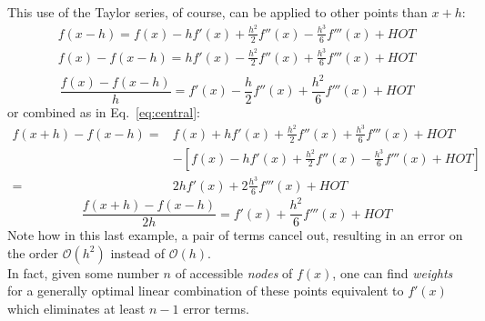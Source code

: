 \documentclass[12pt]{article}
\newcommand{\bigO}{\mathcal{O}}
\begin{document}
This use of the Taylor series, of course, can be applied to other points than $x+h$:
\begin{gather*}
    f(x-h)=f(x)-hf'(x)+\frac{h^2}{2}f''(x)-\frac{h^3}{6}f'''(x)+HOT \\
    f(x)-f(x-h)=hf'(x)-\frac{h^2}{2}f''(x)+\frac{h^3}{6}f'''(x)+HOT \\
\end{gather*}
\begin{equation}
    \frac{f(x)-f(x-h)}{h}=f'(x)-\frac{h}{2}f''(x)+\frac{h^2}{6}f'''(x)+HOT
\end{equation}
or combined as in Eq.~\ref{eq:central}:
\begin{align*}
    f(x+h)-f(x-h)=&f(x)+hf'(x)+\frac{h^2}{2}f''(x)+\frac{h^3}{6}f'''(x)+HOT\\
    &-\left[f(x)-hf'(x)+\frac{h^2}{2}f''(x)-\frac{h^3}{6}f'''(x)+HOT\right]\\
    =&2hf'(x)+2\frac{h^3}{6}f'''(x)+HOT
\end{align*}
\begin{equation}\label{eq:central_err}
    \frac{f(x+h)-f(x-h)}{2h}=f'(x)+\frac{h^2}{6}f'''(x)+HOT
\end{equation}
Note how in this last example, a pair of terms cancel out, resulting in an error on the order $\bigO(h^2)$ instead of $\bigO(h)$.\\

In fact, given some number $n$ of accessible \emph{nodes} of $f(x)$, one can find \emph{weights} for a generally optimal linear combination of these points equivalent to $f'(x)$ which eliminates at least $n-1$ error terms.
\end{document}

